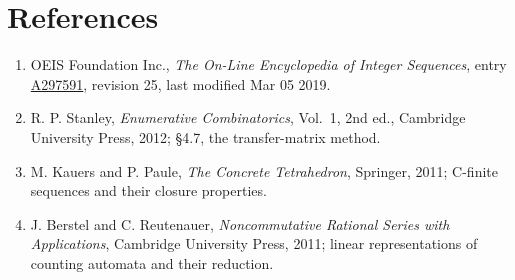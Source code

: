 \documentclass[11pt]{article}
\theoremstyle{definition}
\begin{document}
\section{References}

\begin{enumerate}

\item OEIS Foundation Inc., \emph{The On-Line Encyclopedia of Integer Sequences}, entry \href{https://oeis.org/A297591}{A297591}, revision 25, last modified Mar 05 2019.

\item R. P. Stanley, \emph{Enumerative Combinatorics}, Vol.~1, 2nd ed., Cambridge University Press, 2012; \S4.7, the transfer-matrix method.

\item M. Kauers and P. Paule, \emph{The Concrete Tetrahedron}, Springer, 2011; C-finite sequences and their closure properties.

\item J. Berstel and C. Reutenauer, \emph{Noncommutative Rational Series with Applications}, Cambridge University Press, 2011; linear representations of counting automata and their reduction.

\end{enumerate}
\end{document}
